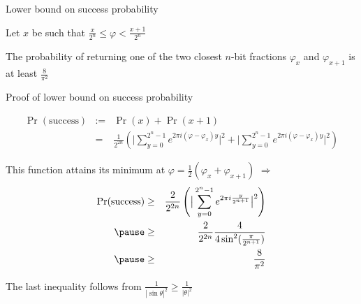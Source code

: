 \begin{frame}{Lower bound on success probability}

\begin{theorem}
Let $x$ be such that $\frac{x}{2^n} \le \varphi < \frac{x+1}{2^n}$

\bigskip
The probability of returning one of the two closest $n$-bit fractions $\varphi_x$ and $\varphi_{x+1}$ is at least $\frac{8}{\pi^2}$
\end{theorem}

\end{frame}




\begin{frame}{Proof of lower bound on success probability}

\begin{eqnarray*}
\Pr(\mbox{success}) & := &
\Pr(x) + \Pr(x+1) \\
& = &
\frac{1}{2^{2n}}
\left( \big| 
\sum_{y = 0}^{{2^n}-1} 
e^{2 \pi i (\varphi - \varphi_x)y}
\big|^2 
+ 
\big|\sum_{y = 0}^{{2^n}-1}
e^{2 \pi i (\varphi - \varphi_x)y}
\big|^2\right)
\end{eqnarray*}

\pause

\medskip
This function attains its minimum at $\varphi = \frac{1}{2} (\varphi_x + \varphi_{x+1})$ \pause \quad $\Rightarrow$
\begin{eqnarray*}
\Pr(\mbox{success}) 
& \geq &
\frac{2}{2^{2n}}
\left(
\big|
\sum_{y = 0}^{{2^n}-1} e^{2 \pi i \frac{y}{2^{n+1}}}
\big|^2
\right) \\ \pause
& \geq &
\frac{2}{2^{2n}}
\frac{4}{4 \sin^2(\frac{\pi}{2^{n+1}})} \\ \pause
& \geq &
\frac{8}{\pi^2}
\end{eqnarray*}

The last inequality follows from $\frac{1}{|\sin{\theta}|^2} \geq \frac{1}{|\theta|^2}$
\end{frame}




